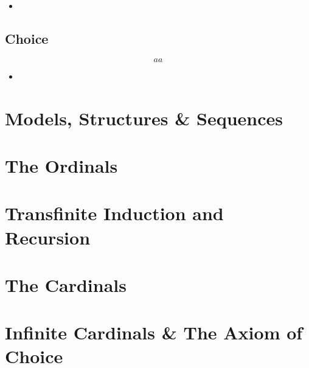 \begin{itemize}
	
	\item 
	
\end{itemize}

\subsection{Choice}
\begin{equation*}
aa
\end{equation*}

\begin{itemize}
	
	\item 
	
\end{itemize}












\section{Models, Structures \& Sequences}

\section{The Ordinals}

\section{Transfinite Induction and Recursion}

\section{The Cardinals}

\section{Infinite Cardinals \& The Axiom of Choice}
